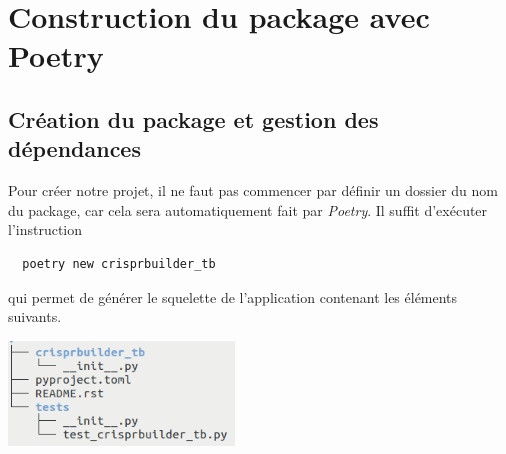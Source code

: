 \documentclass[twoside,a4paper,11pt,frenchb,openany]{report}
\begin{document}
\chapter{Construction du package avec Poetry}



\section{Création du package et gestion des dépendances}

Pour créer notre projet, il ne faut pas commencer par définir un dossier du nom du package, car cela sera automatiquement fait par \textit{Poetry}. Il suffit d'exécuter l'instruction

\begin{verbatim}
  poetry new crisprbuilder_tb
\end{verbatim}

qui permet de générer le squelette de l'application contenant les éléments suivants.

\includegraphics[width=6cm]{nom_package_tree.png}
\end{document}
